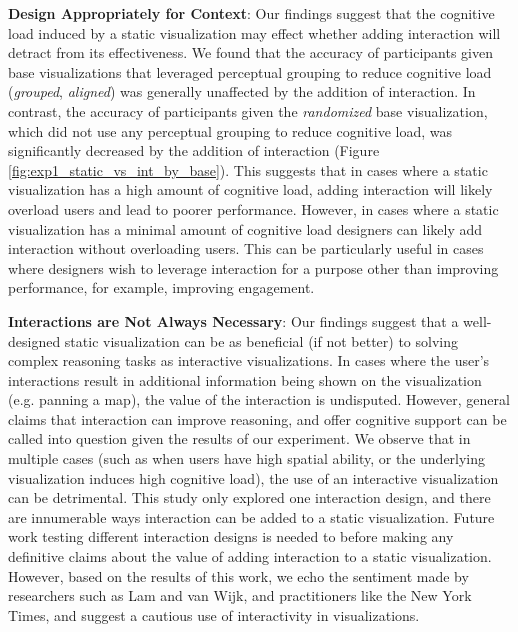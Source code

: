 \vspace{6pt} \noindent \textbf{Design Appropriately for Context}:
Our findings suggest that the cognitive load induced by a static visualization may effect whether adding interaction will detract from its effectiveness. We found that the accuracy of participants given base visualizations that leveraged perceptual grouping to reduce cognitive load (\textit{grouped}, \textit{aligned}) was generally unaffected by the addition of interaction. In contrast, the accuracy of participants given the \textit{randomized} base visualization, which did not use any perceptual grouping to reduce cognitive load, was significantly decreased by the addition of interaction (Figure \ref{fig:exp1_static_vs_int_by_base}). This suggests that in cases where a static visualization has a high amount of cognitive load, adding interaction will likely overload users and lead to poorer performance. However, in cases where a static visualization has a minimal amount of cognitive load designers can likely add interaction without overloading users. This can be particularly useful in cases where designers wish to leverage interaction for a purpose other than improving performance, for example, improving engagement.  

\vspace{6pt} \noindent \textbf{Interactions are Not Always Necessary}: Our findings suggest that a well-designed static visualization can be as beneficial (if not better) to solving complex reasoning tasks as interactive visualizations.
In cases where the user's interactions result in additional information being shown on the visualization (e.g. panning a map), the value of the interaction is undisputed.
However, general claims that interaction can improve reasoning, and offer cognitive support can be called into question given the results of our experiment.
We observe that in multiple cases (such as when users have high spatial ability, or the underlying visualization induces high cognitive load), the use of an interactive visualization can be detrimental. This study only explored one interaction design, and there are innumerable ways interaction can be added to a static visualization. Future work testing different interaction designs is needed to before making any definitive claims about the value of adding interaction to a static visualization. However, based on the results of this work, we echo the sentiment made by researchers such as Lam\cite{lam2008Framework} and van Wijk\cite{wijk2005Value}, and practitioners like the New York Times, and suggest a cautious use of interactivity in visualizations.

